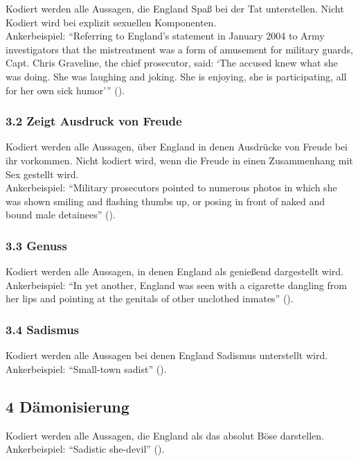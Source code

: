 \documentclass[12pt, titlepage=true, toc=bib]{scrartcl}
\begin{document}
Kodiert werden alle Aussagen, die England Spaß bei der Tat unterstellen. Nicht Kodiert wird bei explizit sexuellen Komponenten.\\
Ankerbeispiel: \enquote{Referring to England's statement in January 2004 to Army investigators that the mistreatment was a form of amusement for military guards, Capt. Chris Graveline, the chief prosecutor, said: \enquote{The accused knew what she was doing. She was laughing and joking. She is enjoying, she is participating, all for her own sick humor}} (\cite[1]{gerstenzang_female_2005}).

\subsubsection*{3.2 Zeigt Ausdruck von Freude}

Kodiert werden alle Aussagen, über England in denen Ausdrücke von Freude bei ihr vorkommen. Nicht kodiert wird, wenn die Freude in einen Zusammenhang mit Sex gestellt wird.\\
Ankerbeispiel: "`Military prosecutors pointed to numerous photos in which she was shown smiling and flashing thumbs up, or posing in front of naked and bound male detainees"' (\cite[1]{gerstenzang_female_2005}).

\subsubsection*{3.3 Genuss}

Kodiert werden alle Aussagen, in denen England als genießend dargestellt wird.\\
Ankerbeispiel: "`In yet another, England was seen with a cigarette dangling from her lips and pointing at the genitals of other unclothed inmates"' (\cite[2]{becker_face_2004}).

\subsubsection*{3.4 Sadismus}

Kodiert werden alle Aussagen bei denen England Sadismus unterstellt wird.\\
Ankerbeispiel: "`Small-town sadist"' (\cite[2]{becker_face_2004}).

\subsection*{4 Dämonisierung}

Kodiert werden alle Aussagen, die England als das absolut Böse darstellen.\\
Ankerbeispiel: "`Sadistic she-devil"' (\cite[1]{becker_face_2004}).
\end{document}
